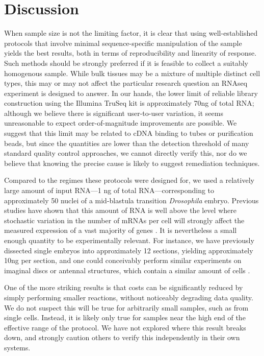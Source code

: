 \section{Discussion}


When sample size is not the limiting factor, it is clear that using well-established protocols that involve minimal sequence-specific manipulation of the sample yields the best results, both in terms of reproducibility and linearity of response. Such methods should be strongly preferred if it is feasible to collect a suitably homogenous sample. While bulk tissues may be a mixture of multiple distinct cell types, this may or may not affect the particular research question an RNAseq experiment is designed to answer.  In our hands, the lower limit of reliable library construction using the Illumina TruSeq kit is approximately 70ng of total RNA; although we believe there is significant user-to-user variation, it seems unreasonable to expect order-of-magnitude improvements are possible. We suggest that this limit may be related to cDNA binding to tubes or purification beads, but since the quantities are lower than the detection threshold of many standard quality control approaches, we cannot directly verify this, nor do we believe that knowing the precise cause is likely to suggest remediation techniques.


Compared to the regimes these protocols were designed for, we used a relatively large amount of input RNA---1 ng of total RNA---corresponding to approximately 50 nuclei of a mid-blastula transition {\em Drosophila} embryo. Previous studies have shown that this amount of RNA is well above the level where stochastic variation in the number of mRNAs per cell will strongly affect the measured expression of a vast majority of genes \cite{Marinov:2013fm}. It is nevertheless a small enough quantity to be experimentally relevant.  For instance, we have previously dissected single embryos into approximately 12 sections, yielding approximately 10ng per section\cite{Combs:2013jy}, and one could conceivably perform similar experiments on imaginal discs or antennal structures, which contain a similar amount of cells \cite{Klebes:2002ua,Hansson:2000cx}.

One of the more striking results is that costs can be significantly reduced by simply performing smaller reactions, without noticeably degrading data quality.  We do not suspect this will be true for arbitrarily small samples, such as from single cells.  Instead, it is likely only true for samples near the high end of the effective range of the protocol. We have not explored where this result breaks down, and strongly caution others to verify this independently in their own systems.
